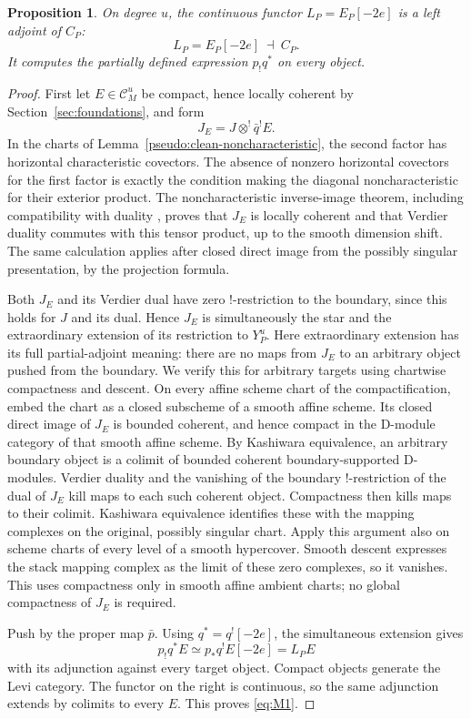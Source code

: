 \documentclass[11pt]{article}
\numberwithin{equation}{section}
\newtheorem{proposition}[theorem]{Proposition}
\theoremstyle{definition}
\theoremstyle{remark}
\begin{document}
\begin{proposition}\label{pseudo:first-adjunction}
On degree $u$, the continuous functor $L_P=E_P[-2e]$ is a left adjoint of
$C_P$:
\begin{equation}\label{eq:M1}
 L_P=E_P[-2e]\ \dashv\ C_P.
\end{equation}
It computes the partially defined expression $p_!q^*$ on every object.
\end{proposition}

\begin{proof}
First let $E\in\mathcal C_M^u$ be compact, hence locally coherent by
Section~\ref{sec:foundations}, and form
\[
 J_E=J\otimes^!\bar q^!E.
\]
In the charts of Lemma~\ref{pseudo:clean-noncharacteristic}, the second
factor has horizontal characteristic covectors.  The absence of nonzero
horizontal covectors for the first factor is exactly the condition making
the diagonal noncharacteristic for their exterior product.  The
noncharacteristic inverse-image theorem, including compatibility with
duality \cite[Theorems~2.4.6 and~2.7.1(ii)]{HottaTakeuchiTanisaki}, proves that $J_E$ is
locally coherent and that Verdier duality commutes with this tensor product,
up to the smooth dimension shift.  The same calculation applies after
closed direct image from the possibly singular presentation, by the
projection formula.

Both $J_E$ and its Verdier dual have zero !-restriction to the boundary,
since this holds for $J$ and its dual.  Hence $J_E$ is simultaneously the
star and the extraordinary extension of its restriction to $Y_P^u$.
Here extraordinary extension has its full partial-adjoint meaning:
there are no maps from $J_E$ to an arbitrary object pushed from the
boundary.  We verify this for arbitrary targets using chartwise compactness
and descent.
On every affine scheme chart of the compactification, embed the chart as
a closed subscheme of a smooth affine scheme.  Its closed direct image
of $J_E$ is bounded coherent, and hence compact in the D-module category
of that smooth affine scheme.  By Kashiwara equivalence, an arbitrary
boundary object is a colimit of bounded coherent boundary-supported
D-modules.  Verdier duality and the vanishing of the boundary !-restriction
of the dual of $J_E$ kill maps to each such coherent object.  Compactness
then kills maps to their colimit.  Kashiwara equivalence identifies these
with the mapping complexes on the original, possibly singular chart.
Apply this argument also on scheme charts of every level of a smooth
hypercover.  Smooth descent expresses the stack mapping complex as the
limit of these zero complexes, so it vanishes.  This uses compactness only
in smooth affine ambient charts; no global compactness of $J_E$ is required.

Push by the proper map $\bar p$.  Using $q^*=q^![-2e]$, the simultaneous
extension gives
\[
 p_!q^*E\simeq p_*q^!E[-2e]=L_PE
\]
with its adjunction against every target object.  Compact objects generate
the Levi category.  The functor on the right is continuous, so the same
adjunction extends by colimits to every $E$.  This proves \eqref{eq:M1}.
\end{proof}
\end{document}
